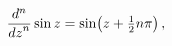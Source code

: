 \[\frac{{d}^{n}}{{dz}^{n}}\mathop{\sin\/}\nolimits z=\mathop{\sin\/}\nolimits\!%
\left(z+\tfrac{1}{2}n\pi\right),\]